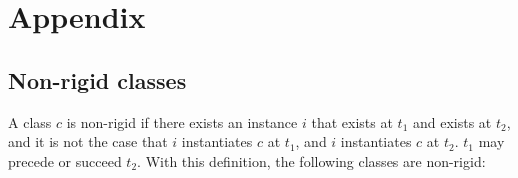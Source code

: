 \documentclass{bioinfo}
\begin{document}




\newpage
\section*{Appendix}

\subsection{Non-rigid classes}

A class $c$ is non-rigid if there exists an instance $i$ that exists
at $t_1$ and exists at $t_2$, and it is not the case that $i$
instantiates $c$ at $t_1$, and $i$ instantiates $c$ at $t_2$. $t_1$
may precede or succeed $t_2$. With this definition, the following
classes are non-rigid:
\end{document}
